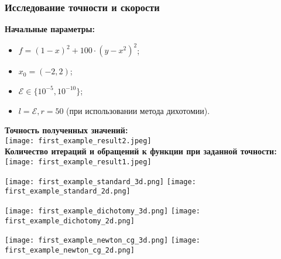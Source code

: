 \documentclass{article}
\begin{document}
\subsubsection*{Исследование точности и скорости}
\textbf{Начальные параметры:}
\begin{itemize}
    \item $f = (1 - x)^{2} + 100 \cdot (y - x^{2})^{2}$;
    \item $x_0 = (-2, 2)$;
    \item $\mathcal{E} \in \{10^{-5}, 10^{-10}\}$;
    \item $l = \mathcal{E}, r = 50$ (при использовании метода дихотомии).
\end{itemize}

\noindent \textbf{Точность полученных значений:} \\

\noindent \texttt{[image: first\_example\_result2.jpeg]} \\

\noindent \textbf{Количество итераций и обращений к функции при заданной точности:} \\

\noindent \texttt{[image: first\_example\_result1.jpeg]}

\begin{center}
    \texttt{[image: first\_example\_standard\_3d.png]}
    \texttt{[image: first\_example\_standard\_2d.png]}
    \label{fig:enter-label}
\end{center}
\begin{center}
    \texttt{[image: first\_example\_dichotomy\_3d.png]}
    \texttt{[image: first\_example\_dichotomy\_2d.png]}
    \label{fig:enter-label}
\end{center}
\begin{center}
    \texttt{[image: first\_example\_newton\_cg\_3d.png]}
    \texttt{[image: first\_example\_newton\_cg\_2d.png]}
    \label{fig:enter-label}
\end{center}

\newpage
\end{document}
